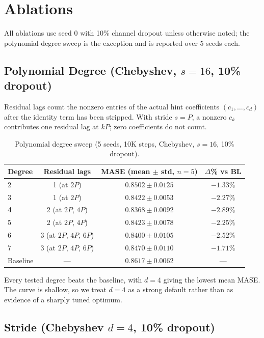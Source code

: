 \documentclass{article}
\begin{document}
\section{Ablations}
\label{app:ablations}

All ablations use seed 0 with 10\% channel dropout unless otherwise noted; the polynomial-degree sweep is the exception and is reported over $5$ seeds each.

\subsection{Polynomial Degree (Chebyshev, $s=16$, 10\% dropout)}

Residual lags count the nonzero entries of the actual hint coefficients $(c_1,\ldots,c_d)$ after the identity term has been stripped. With stride $s=P$, a nonzero $c_k$ contributes one residual lag at $kP$; zero coefficients do not count.

\begin{table}[H]
\centering
\caption{Polynomial degree sweep (5 seeds, 10K steps, Chebyshev, $s=16$, 10\% dropout).}
\small
\begin{tabular}{lccc}
\toprule
\textbf{Degree} & \textbf{Residual lags} & \textbf{MASE (mean $\pm$ std, $n{=}5$)} & \textbf{$\Delta$\% vs BL} \\
\midrule
2 & 1 (at $2P$) & $0.8502 \pm 0.0125$ & $-1.33\%$ \\
3 & 1 (at $2P$) & $0.8422 \pm 0.0053$ & $-2.27\%$ \\
\textbf{4} & 2 (at $2P$, $4P$) & $\mathbf{0.8368 \pm 0.0092}$ & $\mathbf{-2.89\%}$ \\
5 & 2 (at $2P$, $4P$) & $0.8423 \pm 0.0078$ & $-2.25\%$ \\
6 & 3 (at $2P$, $4P$, $6P$) & $0.8400 \pm 0.0105$ & $-2.52\%$ \\
7 & 3 (at $2P$, $4P$, $6P$) & $0.8470 \pm 0.0110$ & $-1.71\%$ \\
\midrule
Baseline & --- & $0.8617 \pm 0.0062$ & --- \\
\bottomrule
\end{tabular}
\end{table}

Every tested degree beats the baseline, with $d=4$ giving the lowest mean MASE. The curve is shallow, so we treat $d=4$ as a strong default rather than as evidence of a sharply tuned optimum.

\subsection{Stride (Chebyshev $d=4$, 10\% dropout)}
\end{document}
